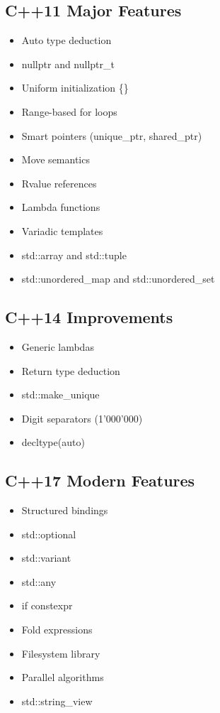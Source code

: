 \hypertarget{c11-major-features}{%
\subsection{C++11 Major Features}\label{c11-major-features}}

\begin{itemize}
\tightlist
\item
  Auto type deduction
\item
  nullptr and nullptr\_t
\item
  Uniform initialization \{\}
\item
  Range-based for loops
\item
  Smart pointers (unique\_ptr, shared\_ptr)
\item
  Move semantics
\item
  Rvalue references
\item
  Lambda functions
\item
  Variadic templates
\item
  std::array and std::tuple
\item
  std::unordered\_map and std::unordered\_set
\end{itemize}

\hypertarget{c14-improvements}{%
\subsection{C++14 Improvements}\label{c14-improvements}}

\begin{itemize}
\tightlist
\item
  Generic lambdas
\item
  Return type deduction
\item
  std::make\_unique
\item
  Digit separators (1'000'000)
\item
  decltype(auto)
\end{itemize}

\hypertarget{c17-modern-features}{%
\subsection{C++17 Modern Features}\label{c17-modern-features}}

\begin{itemize}
\tightlist
\item
  Structured bindings
\item
  std::optional
\item
  std::variant
\item
  std::any
\item
  if constexpr
\item
  Fold expressions
\item
  Filesystem library
\item
  Parallel algorithms
\item
  std::string\_view
\end{itemize}

